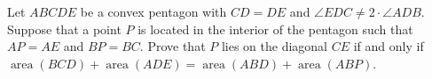 Let $ABCDE$ be a convex pentagon with $CD = DE$ and $\angle EDC \neq 2 \cdot \angle ADB$. Suppose that a point $P$ is located in the interior of the pentagon such that $AP = AE$ and $BP = BC$. Prove that $P$ lies on the diagonal $CE$ if and only if $\operatorname{area}(BCD) + \operatorname{area}(ADE) = \operatorname{area}(ABD) + \operatorname{area}(ABP)$.
